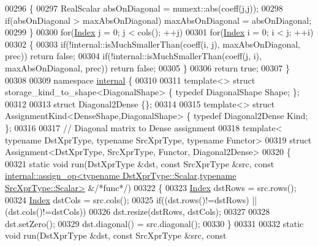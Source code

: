 \begin{DoxyCode}
00296   \{
00297     RealScalar absOnDiagonal = numext::abs(coeff(j,j));
00298     \textcolor{keywordflow}{if}(absOnDiagonal > maxAbsOnDiagonal) maxAbsOnDiagonal = absOnDiagonal;
00299   \}
00300   \textcolor{keywordflow}{for}(\hyperlink{group___core___module_a554f30542cc2316add4b1ea0a492ff02}{Index} j = 0; j < cols(); ++j)
00301     \textcolor{keywordflow}{for}(\hyperlink{group___core___module_a554f30542cc2316add4b1ea0a492ff02}{Index} i = 0; i < j; ++i)
00302     \{
00303       \textcolor{keywordflow}{if}(!internal::isMuchSmallerThan(coeff(i, j), maxAbsOnDiagonal, prec)) \textcolor{keywordflow}{return} \textcolor{keyword}{false};
00304       \textcolor{keywordflow}{if}(!internal::isMuchSmallerThan(coeff(j, i), maxAbsOnDiagonal, prec)) \textcolor{keywordflow}{return} \textcolor{keyword}{false};
00305     \}
00306   \textcolor{keywordflow}{return} \textcolor{keyword}{true};
00307 \}
00308 
00309 \textcolor{keyword}{namespace }\hyperlink{namespaceinternal}{internal} \{
00310 
00311 \textcolor{keyword}{template}<> \textcolor{keyword}{struct }storage\_kind\_to\_shape<DiagonalShape> \{ \textcolor{keyword}{typedef} DiagonalShape Shape; \};
00312 
00313 \textcolor{keyword}{struct }Diagonal2Dense \{\};
00314 
00315 \textcolor{keyword}{template}<> \textcolor{keyword}{struct }AssignmentKind<DenseShape,DiagonalShape> \{ \textcolor{keyword}{typedef} Diagonal2Dense Kind; \};
00316 
00317 \textcolor{comment}{// Diagonal matrix to Dense assignment}
00318 \textcolor{keyword}{template}< \textcolor{keyword}{typename} DstXprType, \textcolor{keyword}{typename} SrcXprType, \textcolor{keyword}{typename} Functor>
00319 \textcolor{keyword}{struct }Assignment<DstXprType, SrcXprType, Functor, Diagonal2Dense>
00320 \{
00321   \textcolor{keyword}{static} \textcolor{keywordtype}{void} run(DstXprType &dst, \textcolor{keyword}{const} SrcXprType &src, \textcolor{keyword}{const} 
      \hyperlink{struct_eigen_1_1internal_1_1assign__op}{internal::assign\_op<typename DstXprType::Scalar,typename SrcXprType::Scalar>}
       &\textcolor{comment}{/*func*/})
00322   \{
00323     \hyperlink{group___core___module_a554f30542cc2316add4b1ea0a492ff02}{Index} dstRows = src.rows();
00324     \hyperlink{group___core___module_a554f30542cc2316add4b1ea0a492ff02}{Index} dstCols = src.cols();
00325     \textcolor{keywordflow}{if}((dst.rows()!=dstRows) || (dst.cols()!=dstCols))
00326       dst.resize(dstRows, dstCols);
00327     
00328     dst.setZero();
00329     dst.diagonal() = src.diagonal();
00330   \}
00331   
00332   \textcolor{keyword}{static} \textcolor{keywordtype}{void} run(DstXprType &dst, \textcolor{keyword}{const} SrcXprType &src, \textcolor{keyword}{const} 

\end{DoxyCode}
